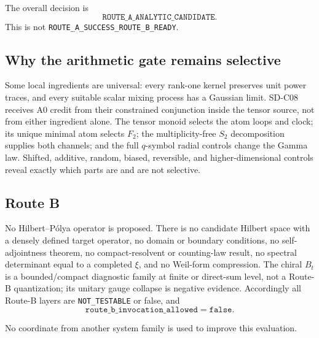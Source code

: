 The overall decision is
\[
 \texttt{ROUTE\_A\_ANALYTIC\_CANDIDATE}.
\]
This is not \texttt{ROUTE\_A\_SUCCESS\_ROUTE\_B\_READY}.

\subsection{Why the arithmetic gate remains selective}

Some local ingredients are universal: every rank-one kernel preserves unit
power traces, and every suitable scalar mixing process has a Gaussian limit.
SD-C08 receives A0 credit from their constrained conjunction inside the
tensor source, not from either ingredient alone. The tensor monoid selects
the atom loops and clock; its unique minimal atom selects $F_2$; the
multiplicity-free $S_2$ decomposition supplies both channels; and the full
$q$-symbol radial controls change the Gamma law. Shifted, additive, random,
biased, reversible, and higher-dimensional controls reveal exactly which
parts are and are not selective.

\subsection{Route B}

No Hilbert--P\'olya operator is proposed. There is no candidate Hilbert space
with a densely defined target operator, no domain or boundary conditions, no
self-adjointness theorem, no compact-resolvent or counting-law result, no
spectral determinant equal to a completed $\xi$, and no Weil-form
compression. The chiral $B_t$ is a bounded/compact diagnostic family at
finite or direct-sum level, not a Route-B quantization; its unitary gauge
collapse is negative evidence. Accordingly all Route-B layers are
\texttt{NOT\_TESTABLE} or false, and
\[
 \mathtt{route\_b\_invocation\_allowed=false}.
\]

No coordinate from another system family is used to improve this evaluation.
